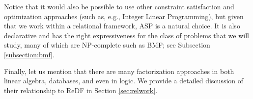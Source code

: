 Notice that it would also be possible to use other constraint satisfaction and optimization approaches
(such as, e.g., Integer Linear Programming), but given that we work within a relational framework, ASP is a natural choice. It is also declarative and has the right expressiveness for the class of problems that we will study, many of which are NP-complete such as BMF; see Subsection \ref{subsection:bmf}. 

Finally, let us mention that there are many factorization approaches in both linear algebra, databases, and even in logic. We provide a detailed discussion of their relationship to ReDF in Section \ref{sec:relwork}.

